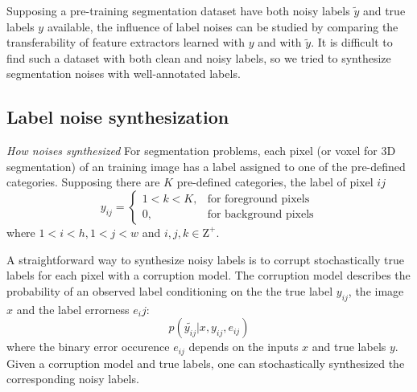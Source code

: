 Supposing a pre-training segmentation dataset have both noisy labels $\tilde{y}$ and true labels $y$ available, the influence of label noises can be studied by comparing the transferability of feature extractors learned with $y$ and with $\tilde{y}$. It is difficult to find such a dataset with both clean and noisy labels, so we tried to synthesize segmentation noises with well-annotated labels.



\subsection{Label noise synthesization}
\label{subsec:noises}

\noindent \textit{How noises synthesized}
\noindent
For segmentation problems, each pixel (or voxel for 3D segmentation) of an training image has a label assigned to one of the pre-defined categories.
Supposing there are $K$ pre-defined categories, the label of pixel ${ij}$
\[
  y_{ij} =
    \begin{cases}
      1 < k < K, & \text{for foreground pixels} \\
      0, & \text{for background pixels}
    \end{cases}
\]
where $1 < i < h, 1 < j < w$ and $i,j,k \in \mathrm{Z}^+$.

A straightforward way to synthesize noisy labels is to corrupt stochastically true labels for each pixel with a corruption model.
The corruption model describes the probability of an observed label conditioning on the the true label $y_{ij}$, the image $x$ and the label errorness $e_ij$:
$$p(\tilde{y_{ij}} \vert x, y_{ij}, e_{ij})$$
where the binary error occurence $e_{ij}$ depends on the inputs $x$ and true labels $y$.
Given a corruption model and true labels, one can stochastically synthesized the corresponding noisy labels.

